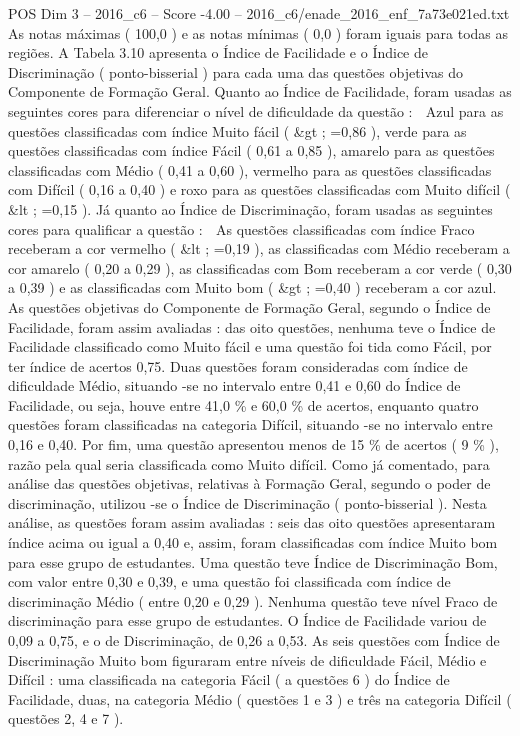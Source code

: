 \begin{textsample}{POS Dim 3 – 2016\_c6 – Score -4.00 – 2016\_c6/enade\_2016\_enf\_7a73e021ed.txt}
As notas máximas ( 100,0 ) e as notas mínimas ( 0,0 ) foram iguais para todas as regiões.
A Tabela 3.10 apresenta o Índice de Facilidade e o Índice de Discriminação ( ponto-bisserial ) para cada uma das questões objetivas do Componente de Formação Geral.
Quanto ao Índice de Facilidade, foram usadas as seguintes cores para diferenciar o nível de dificuldade da questão :  Azul para as questões classificadas com índice Muito fácil ( \&gt ; =0,86 ), verde para as questões classificadas com índice Fácil ( 0,61 a 0,85 ), amarelo para as questões classificadas com Médio ( 0,41 a 0,60 ), vermelho para as questões classificadas com Difícil ( 0,16 a 0,40 ) e roxo para as questões classificadas com Muito difícil ( \&lt ; =0,15 ).
Já quanto ao Índice de Discriminação, foram usadas as seguintes cores para qualificar a questão :  As questões classificadas com índice Fraco receberam a cor vermelho ( \&lt ; =0,19 ), as classificadas com Médio receberam a cor amarelo ( 0,20 a 0,29 ), as classificadas com Bom receberam a cor verde ( 0,30 a 0,39 ) e as classificadas com Muito bom ( \&gt ; =0,40 ) receberam a cor azul.
As questões objetivas do Componente de Formação Geral, segundo o Índice de Facilidade, foram assim avaliadas : das oito questões, nenhuma teve o Índice de Facilidade classificado como Muito fácil e uma questão foi tida como Fácil, por ter índice de acertos 0,75.
Duas questões foram consideradas com índice de dificuldade Médio, situando -se no intervalo entre 0,41 e 0,60 do Índice de Facilidade, ou seja, houve entre 41,0 \% e 60,0 \% de acertos, enquanto quatro questões foram classificadas na categoria Difícil, situando -se no intervalo entre 0,16 e 0,40.
Por fim, uma questão apresentou menos de 15 \% de acertos ( 9 \% ), razão pela qual seria classificada como Muito difícil.
Como já comentado, para análise das questões objetivas, relativas à Formação Geral, segundo o poder de discriminação, utilizou -se o Índice de Discriminação ( ponto-bisserial ).
Nesta análise, as questões foram assim avaliadas : seis das oito questões apresentaram índice acima ou igual a 0,40 e, assim, foram classificadas com índice Muito bom para esse grupo de estudantes.
Uma questão teve Índice de Discriminação Bom, com valor entre 0,30 e 0,39, e uma questão foi classificada com índice de discriminação Médio ( entre 0,20 e 0,29 ).
Nenhuma questão teve nível Fraco de discriminação para esse grupo de estudantes.
O Índice de Facilidade variou de 0,09 a 0,75, e o de Discriminação, de 0,26 a 0,53.
As seis questões com Índice de Discriminação Muito bom figuraram entre níveis de dificuldade Fácil, Médio e Difícil : uma classificada na categoria Fácil ( a questões 6 ) do Índice de Facilidade, duas, na categoria Médio ( questões 1 e 3 ) e três na categoria Difícil ( questões 2, 4 e 7 ).

\end{textsample}
